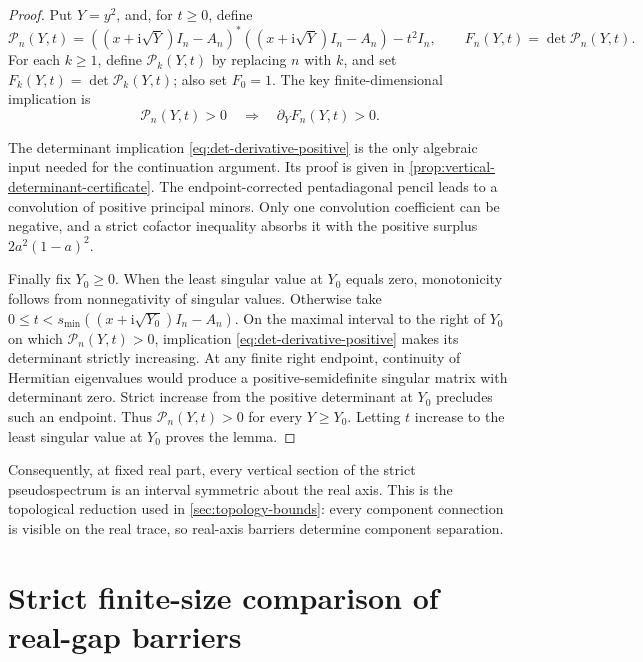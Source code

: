 \documentclass[12pt,anonymous]{iopjournal}
\numberwithin{equation}{section}
\theoremstyle{remark}
\newcommand{\ii}{\mathrm i}
\begin{document}
\begin{proof}
Put \(Y=y^2\), and, for \(t\geq0\), define
\[
 \mathcal P_n(Y,t)=((x+\ii\sqrt Y)I_n-A_n)^*
 ((x+\ii\sqrt Y)I_n-A_n)-t^2I_n,
 \qquad F_n(Y,t)=\det \mathcal P_n(Y,t).
\]
For each \(k\geq1\), define \(\mathcal P_k(Y,t)\) by replacing \(n\) with
\(k\), and set \(F_k(Y,t)=\det \mathcal P_k(Y,t)\); also set \(F_0=1\).
The key finite-dimensional implication is
\begin{equation}\label{eq:det-derivative-positive}
 \mathcal P_n(Y,t)>0\quad\Longrightarrow\quad
 \partial_YF_n(Y,t)>0.
\end{equation}

The determinant implication \eqref{eq:det-derivative-positive} is the only
algebraic input needed for the continuation argument.  Its proof is given in
\cref{prop:vertical-determinant-certificate}.  The endpoint-corrected
pentadiagonal pencil leads to a convolution of positive principal minors.
Only one convolution coefficient can be negative, and a strict cofactor
inequality absorbs it with the positive surplus \(2a^2(1-a)^2\).

Finally fix \(Y_0\geq0\).  When the least singular value at \(Y_0\) equals
zero, monotonicity follows from nonnegativity of singular values.  Otherwise
take \(0\leq t<s_{\min}((x+\ii\sqrt{Y_0})I_n-A_n)\).  On the maximal interval
to the right of \(Y_0\) on which \(\mathcal P_n(Y,t)>0\), implication
\eqref{eq:det-derivative-positive} makes its determinant strictly increasing.
At any finite right endpoint, continuity of Hermitian eigenvalues would
produce a positive-semidefinite singular matrix with determinant zero.
Strict increase from the positive determinant at \(Y_0\) precludes such an
endpoint.
Thus \(\mathcal P_n(Y,t)>0\) for every \(Y\geq Y_0\).  Letting \(t\) increase to
the least singular value at \(Y_0\) proves the lemma.
\end{proof}

Consequently, at fixed real part, every vertical section of the strict
pseudospectrum is an interval symmetric about the real axis.  This is the
topological reduction used in \cref{sec:topology-bounds}: every component
connection is visible on the real trace, so real-axis barriers determine
component separation.

\section{Strict finite-size comparison of real-gap barriers}
\label{sec:mesh}
\end{document}
